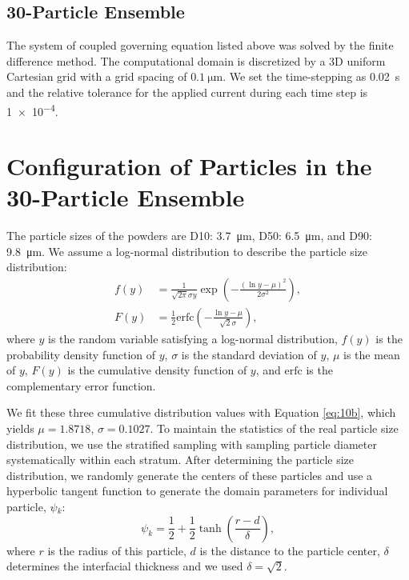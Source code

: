 \documentclass{article}
\begin{document}
\subsection{30-Particle Ensemble}

The system of coupled governing equation listed above was solved by
the finite difference method. The computational domain is discretized
by a 3D uniform Cartesian grid with a grid spacing of $\SI{0.1}{\micro\meter}$. We set the time-stepping
as \SI{0.02}{\second} and the relative tolerance for the applied
current during each time step is \num{1e-4}.


\section{Configuration of Particles in the 30-Particle Ensemble}

The particle sizes of the \nca{} powders are D10:
\SI{3.7}{\micro\meter}, D50: \SI{6.5}{\micro\meter}, and D90:
\SI{9.8}{\micro\meter}. We assume a log-normal distribution to
describe the particle size distribution:
\begin{subequations}
\begin{align}
  f(y) & = \frac {1}{\sqrt{2\pi}\sigma y} \exp \left(-\frac{(\ln{y}-\mu )^2}{2\sigma^2}\right),
  \label{eq:10a} \\
  F(y) &= \frac{1}{2} \mathrm{erfc}\left(-\frac{\ln{y}-\mu }{\sqrt{2}\sigma}\right),
  \label{eq:10b}
\end{align}
\end{subequations}
where $y$ is the random variable satisfying a log-normal distribution,
$f(y)$ is the probability density function of $y$, $\sigma$ is the
standard deviation of $y$, $\mu$ is the mean of $y$, $F(y)$ is the
cumulative density function of $y$, and $\mathrm{erfc}$ is the
complementary error function.

We fit these three cumulative distribution values with Equation
\ref{eq:10b}, which yields $\mu =1.8718$, $\sigma=0.1027$. To maintain
the statistics of the real particle size distribution, we use the
stratified sampling \cite{parsons2017} with sampling particle diameter
systematically within each stratum. After determining the particle
size distribution, we randomly generate the centers of these particles
and use a hyperbolic tangent function to generate the domain
parameters for individual particle, $\psi{}_k$:
\begin{equation}
  \psi_k=\frac{1}{2}+\frac{1}{2}\tanh\left(\frac{r-d}{\delta}\right),
  \label{eq:11}
\end{equation}
where $r$ is the radius of this particle, $d$ is the distance to the
particle center, $\delta$ determines the interfacial thickness and we
used $\delta = \sqrt{2}$.
\end{document}

